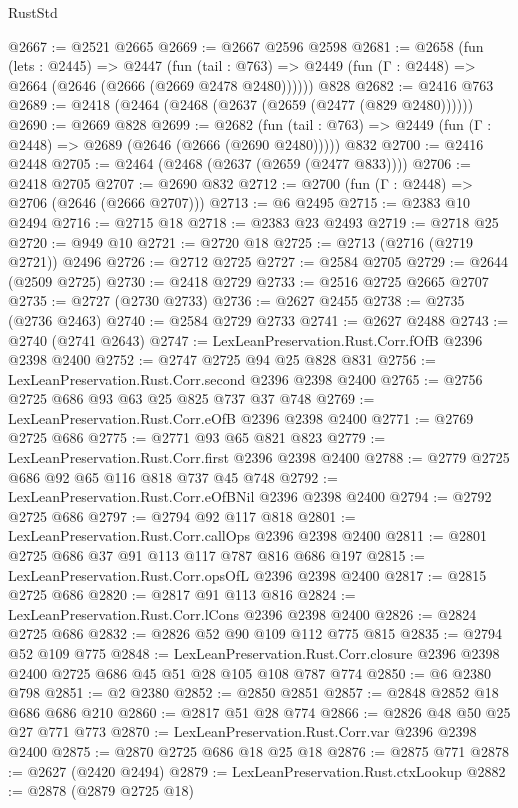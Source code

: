 \begin{lexlean}{RustStd}
\begin{coremodule}
@2667 := @2521 @2665
@2669 := @2667 @2596 @2598
@2681 := @2658
    (fun (lets : @2445) =>
    @2447
      (fun (tail : @763) => @2449 (fun (Γ : @2448) => @2664 (@2646 (@2666 (@2669 @2478 @2480))))))
    @828
@2682 := @2416 @763
@2689 := @2418 (@2464 (@2468 (@2637 (@2659 (@2477 (@829 @2480))))))
@2690 := @2669 @828
@2699 := @2682
    (fun (tail : @763) => @2449 (fun (Γ : @2448) => @2689 (@2646 (@2666 (@2690 @2480)))))
    @832
@2700 := @2416 @2448
@2705 := @2464 (@2468 (@2637 (@2659 (@2477 @833))))
@2706 := @2418 @2705
@2707 := @2690 @832
@2712 := @2700 (fun (Γ : @2448) => @2706 (@2646 (@2666 @2707)))
@2713 := @6 @2495
@2715 := @2383 @10 @2494
@2716 := @2715 @18
@2718 := @2383 @23 @2493
@2719 := @2718 @25
@2720 := @949 @10
@2721 := @2720 @18
@2725 := @2713 (@2716 (@2719 @2721)) @2496
@2726 := @2712 @2725
@2727 := @2584 @2705
@2729 := @2644 (@2509 @2725)
@2730 := @2418 @2729
@2733 := @2516 @2725 @2665 @2707
@2735 := @2727 (@2730 @2733)
@2736 := @2627 @2455
@2738 := @2735 (@2736 @2463)
@2740 := @2584 @2729 @2733
@2741 := @2627 @2488
@2743 := @2740 (@2741 @2643)
@2747 := LexLeanPreservation.Rust.Corr.fOfB @2396 @2398 @2400
@2752 := @2747 @2725 @94 @25 @828 @831
@2756 := LexLeanPreservation.Rust.Corr.second @2396 @2398 @2400
@2765 := @2756 @2725 @686 @93 @63 @25 @825 @737 @37 @748
@2769 := LexLeanPreservation.Rust.Corr.eOfB @2396 @2398 @2400
@2771 := @2769 @2725 @686
@2775 := @2771 @93 @65 @821 @823
@2779 := LexLeanPreservation.Rust.Corr.first @2396 @2398 @2400
@2788 := @2779 @2725 @686 @92 @65 @116 @818 @737 @45 @748
@2792 := LexLeanPreservation.Rust.Corr.eOfBNil @2396 @2398 @2400
@2794 := @2792 @2725 @686
@2797 := @2794 @92 @117 @818
@2801 := LexLeanPreservation.Rust.Corr.callOps @2396 @2398 @2400
@2811 := @2801 @2725 @686 @37 @91 @113 @117 @787 @816 @686 @197
@2815 := LexLeanPreservation.Rust.Corr.opsOfL @2396 @2398 @2400
@2817 := @2815 @2725 @686
@2820 := @2817 @91 @113 @816
@2824 := LexLeanPreservation.Rust.Corr.lCons @2396 @2398 @2400
@2826 := @2824 @2725 @686
@2832 := @2826 @52 @90 @109 @112 @775 @815
@2835 := @2794 @52 @109 @775
@2848 := LexLeanPreservation.Rust.Corr.closure
    @2396
    @2398
    @2400
    @2725
    @686
    @45
    @51
    @28
    @105
    @108
    @787
    @774
@2850 := @6 @2380 @798
@2851 := @2 @2380
@2852 := @2850 @2851
@2857 := @2848 @2852 @18 @686 @686 @210
@2860 := @2817 @51 @28 @774
@2866 := @2826 @48 @50 @25 @27 @771 @773
@2870 := LexLeanPreservation.Rust.Corr.var @2396 @2398 @2400
@2875 := @2870 @2725 @686 @18 @25 @18
@2876 := @2875 @771
@2878 := @2627 (@2420 @2494)
@2879 := LexLeanPreservation.Rust.ctxLookup
@2882 := @2878 (@2879 @2725 @18)

\end{coremodule}
\end{lexlean}
